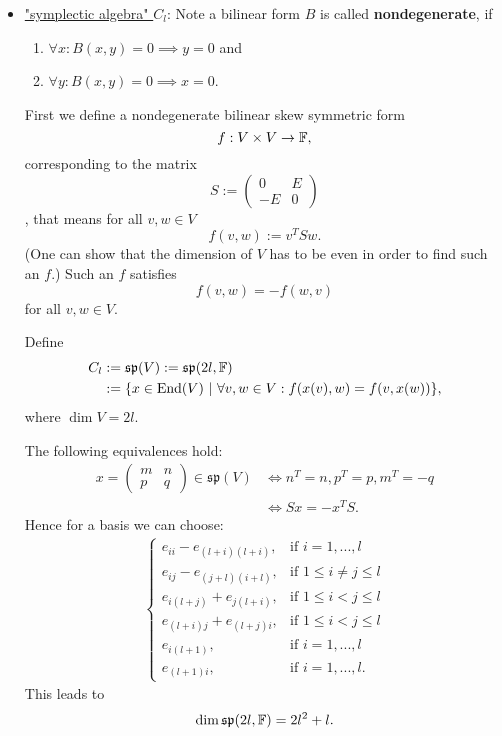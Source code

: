 \begin{example}
\begin{itemize}[label=]
        \item \underline{"symplectic algebra" $C_l$}:
        \renewcommand{\sp}{\mathfrak{sp}} 
        Note a bilinear form $B$ is called \textbf{nondegenerate}, if 
        \begin{enumerate}
            \item $\forall x: B(x,y) = 0 \implies y = 0$ and
            \item $\forall y: B(x,y) = 0 \implies x = 0$.
        \end{enumerate}

        First we define a nondegenerate bilinear skew symmetric form 
        $$ f: V \times V \to \mathbb{F},$$
        corresponding to the matrix
        $$ S := \begin{pmatrix}
            0 & E \\
            -E & 0
        \end{pmatrix}$$, that means for all $v,w \in V$
        $$ f(v,w) := v^TSw.$$
        (One can show that the dimension of $V$ has to be even in order to find 
        such an $f$.)
        Such an $f$ satisfies $$f(v,w) = -f(w,v)$$ for all $v,w \in V$.
        
        Define
        \begin{align*}
            C_l &:= \sp(V) := \sp(2l, \F) \\
                &:= \{x \in \End(V) \| \forall v,w \in V: f(x(v),w) = f(v, x(w))\}, 
        \end{align*}
        where $\dim V = 2l$.

        The following equivalences hold:
        \begin{align*}
            x = \begin{pmatrix}
                m & n \\
                p & q
            \end{pmatrix} \in \sp(V) &\iff n^T = n, p^T = p, m^T=-q \\
                                     &\iff Sx = -x^TS.
        \end{align*}
        Hence for a basis we can choose:
        \begin{align*}
            \begin{cases}
                e_{ii} - e_{(l+i)(l+i)}, & \text{if } i=1,...,l\\
                e_{ij} - e_{(j+l)(i+l)}, & \text{if } 1 \leq i\ne j \leq l\\
                e_{i (l+j)} + e_{j (l+i)}, & \text{if } 1 \leq i < j \leq l \\
                e_{(l+i) j} + e_{(l+j) i}, & \text{if } 1 \leq i < j \leq l \\
                e_{i(l+1)}, & \text{if } i=1,...,l \\
                e_{(l+1)i}, & \text{if } i=1,...,l.
            \end{cases}
        \end{align*}
            This leads to $$\dim \sp(2l, \F) = 2l^2 +l.$$


\end{itemize}
\end{example}
